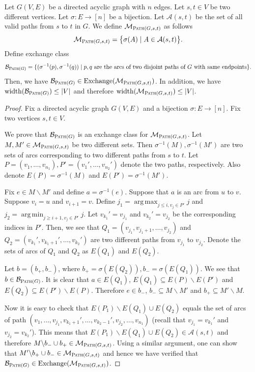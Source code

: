 \documentclass{article}
\newcommand{\M}{\mathcal M}
\newcommand{\B}{\mathcal B}
\newcommand{\del}{\backslash}
\DeclareMathOperator{\rank}{width}
\DeclareMathOperator*{\argmax}{arg\,max}
\DeclareMathOperator*{\argmin}{arg\,min}
\DeclareMathOperator{\Exchange}{Exchange}
\newcommand{\Path}{\textsc{Path}\xspace}
\begin{document}
\begin{fact}[Path]
\label{fact:path}
Let $G(V,E)$ be a directed acyclic graph with $n$ edges.
Let $s,t\in V$ be two different vertices.
Let $\sigma\colon E\rightarrow [n]$ be a bijection.
Let $\mathcal A(s,t)$ be the set of all valid paths from $s$ to $t$ in $G$. 
We define $\M_{\Path(G,s,t)}$ as follows
$$
\M_{\Path(G,s,t)} = \big\{\sigma(A) \mid A\in\mathcal A(s,t) \big\}.
$$
Define exchange class
$$
\B_{\Path(G)} = \{(\sigma^{-1}(p), \sigma^{-1}(q)) \mid p,q \text{ are the arcs of two disjoint paths of }G\text{ with same endpoints}\}.
$$
Then, we have $\B_{\Path(G)} \in \Exchange(\M_{\Path(G,s,t)})$. 
In addition, we have $\rank(\B_{\Path(G)}) \le |V|$ and therefore $\rank(\M_{\Path(G,s,t)}) \le |V|$.
\end{fact}

\begin{proof}
Fix  a directed acyclic graph $G(V,E)$ and a bijection $\sigma\colon E\rightarrow [n]$. 
Fix two vertices $s,t\in V$.

We prove that $\B_{\Path(G)}$ is an exchange class for $\M_{\Path(G,s,t)}$.
Let $M,M' \in \M_{\Path(G,s,t)}$ be two different sets. 
Then $\sigma^{-1}(M),\sigma^{-1}(M')$ are two sets of arcs corresponding to two different paths from $s$ to $t$.
Let $P=(v_1,\ldots,v_{n_1}),P'=(v_1',\ldots,v_{n_2}')$ denote the two paths, respectively. 
Also denote $E(P) = \sigma^{-1}(M)$ and $E(P') = \sigma^{-1}(M')$.


Fix $e\in M\del M'$ and define $a=\sigma^{-1}(e)$.
Suppose that $a$ is an arc from $u$ to $v$.
Suppose $v_i=u$ and $v_{i+1} = v$.
Define $j_1 = \argmax_{j \le i, v_j\in P'} j$ and $j_2 = \argmin_{j \ge i+1, v_j \in P'} j$.
Let $v_{k_1}' = v_{j_1}$ and $v_{k_2}'= v_{j_2}$ be the corresponding indices in $P'$.
Then, we see that $Q_1=(v_{j_1},v_{j_1+1},\ldots,v_{j_2})$ and $Q_2= (v_{k_1}',v_{k_1+1}', \ldots,v_{k_2}')$ are two different paths from $v_{j_1}$ to $v_{j_2}$. 
Denote the sets of arcs of $Q_1$ and $Q_2$ as $E(Q_1)$ and $E(Q_2)$. 

Let $b=(b_+,b_-)$, where $b_+=\sigma(E(Q_2)), b_-=\sigma(E(Q_1))$. We see that $b \in \B_{\Path(G)}$.
It is clear that $a\in E(Q_1)$, $E(Q_1) \subseteq E(P) \del E(P')$ and $E(Q_2) \subseteq E(P') \del E(P)$. 
Therefore $e\in b_-$, $b_-\subseteq M\del M'$ and $b_+\subseteq M'\del M$.

Now it is easy to check that $E(P_1)\del E(Q_1) \cup E(Q_2)$ equals the set of arcs of path $(v_1,\ldots, v_{j_1}, v_{k_1+1}',\ldots, v_{k_2-1}', v_{j_2},\ldots, v_{n_1})$ (recall that $v_{j_1}=v_{k_1}'$ and $v_{j_2}=v_{k_2}'$).
This means that $E(P_1)\del E(Q_1)\cup E(Q_2) \in \mathcal A(s,t)$ and therefore $M\del b_-\cup b_+ \in \M_{\Path(G,s,t)}$.
Using a similar argument, one can show that $M'\del b_+\cup b_- \in \M_{\Path(G,s,t)}$ and hence we have verified that 
$\B_{\Path(G)}\in\Exchange(\M_{\Path(G,s,t)})$.
\end{proof}
\end{document}
